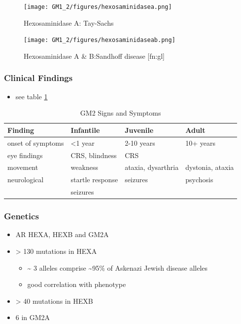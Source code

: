 \documentclass[12pt]{scrartcl}
\begin{document}
\begin{figure}[htbp]
\centering
\texttt{[image: GM1\_2/figures/hexosaminidasea.png]}
\caption{\label{fig:orgc01062d}Hexosaminidase A: Tay-Sachs}
\end{figure}


\begin{figure}[htbp]
\centering
\texttt{[image: GM1\_2/figures/hexosaminidaseab.png]}
\caption{\label{fig:org1a93481}Hexosaminidase A \& B:Sandhoff disease [fn:gl]}
\end{figure}

\subsubsection{Clinical Findings}
\label{sec:org0183d08}
\begin{itemize}
\item see table \ref{tab:org115cadc}
\end{itemize}
\begin{table}[htbp]
\caption{\label{tab:org115cadc}GM2 Signs and Symptoms}
\centering
\begin{tabular}{llll}
Finding & Infantile & Juvenile & Adult\\
\hline
onset of symptoms & <1 year & 2-10 years & 10+ years\\
eye findings & CRS, blindness & \textpm{} CRS & \\
movement & weakness & ataxia, dysarthria & dystonia, ataxia\\
neurological & startle response & seizures & psychosis\\
 & seizures &  & \\
\end{tabular}
\end{table}

\subsubsection{Genetics}
\label{sec:org9710ac8}
\begin{itemize}
\item AR HEXA, HEXB and GM2A
\item > 130 mutations in HEXA
\begin{itemize}
\item \textasciitilde{} 3 alleles comprise \textasciitilde{}95\% of Askenazi Jewish disease alleles
\item good correlation with phenotype
\end{itemize}
\item > 40 mutations in HEXB
\item 6 in GM2A
\end{itemize}
\end{document}
